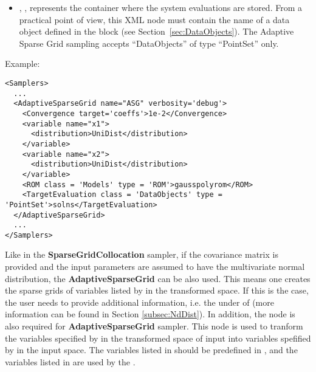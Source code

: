         \begin{itemize}
      \item {}, ,
        represents the container where the system evaluations are stored.
        From a practical point of view, this XML node must contain the name of
        a data object defined in the  block (see
        Section~\ref{sec:DataObjects}).
        The Adaptive Sparse Grid sampling accepts ``DataObjects'' of type
        ``PointSet'' only.
\end{itemize}

Example:
\begin{lstlisting}[style=XML,morekeywords={class,limit,subGridTol,weight,persistence}]
<Samplers>
  ...
  <AdaptiveSparseGrid name="ASG" verbosity='debug'>
    <Convergence target='coeffs'>1e-2</Convergence>
    <variable name="x1">
      <distribution>UniDist</distribution>
    </variable>
    <variable name="x2">
      <distribution>UniDist</distribution>
    </variable>
    <ROM class = 'Models' type = 'ROM'>gausspolyrom</ROM>
    <TargetEvaluation class = 'DataObjects' type = 'PointSet'>solns</TargetEvaluation>
  </AdaptiveSparseGrid>
  ...
</Samplers>
\end{lstlisting}

Like in the \textbf{SparseGridCollocation} sampler, if the covariance matrix is provided
and the input parameters are assumed to have the multivariate normal distribution, the \textbf{AdaptiveSparseGrid} can be also used.
This means one creates the sparse grids of variables listed by  in the transformed space. If this is
the case, the user needs to provide additional information, i.e. the  under 
of  (more information can be found in Section \ref{subsec:NdDist}). In addition, the node
 is also required for \textbf{AdaptiveSparseGrid} sampler. This node is used to tranform
the variables specified by  in the transformed space of input into variables spefified by
 in the input space. The variables listed in  should be predefined
in , and the variables listed in 
are used by the .

